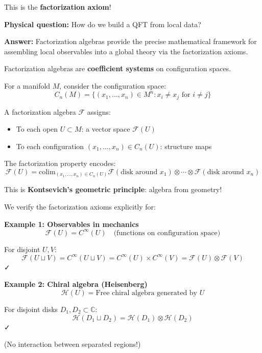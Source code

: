 \begin{example}
\begin{motivation}
This is the \textbf{factorization axiom}!

\textbf{Physical question:} How do we build a QFT from local data?

\textbf{Answer:} Factorization algebras provide the precise mathematical framework 
for assembling local observables into a global theory via the factorization axioms.
\end{motivation}

\begin{construction}
Factorization algebras are \textbf{coefficient systems} on configuration spaces.

For a manifold $M$, consider the configuration space:
$$C_n(M) = \{(x_1, \ldots, x_n) \in M^n : x_i \neq x_j \text{ for } i \neq j\}$$

A factorization algebra $\mathcal{F}$ assigns:
\begin{itemize}
\item To each open $U \subset M$: a vector space $\mathcal{F}(U)$
\item To each configuration $(x_1, \ldots, x_n) \in C_n(U)$: structure maps
\end{itemize}

The factorization property encodes:
$$\mathcal{F}(U)= \text{colim}_{(x_1,\ldots,x_n) \in C_n(U)} 
   \mathcal{F}(\text{disk around } x_1) \otimes \cdots \otimes 
   \mathcal{F}(\text{disk around } x_n)$$

This is \textbf{Kontsevich's geometric principle}: algebra from geometry!
\end{construction}

\begin{computation}
We verify the factorization axioms explicitly for:

\textbf{Example 1: Observables in mechanics}
$$\mathcal{F}(U) = C^\infty(U) \quad \text{(functions on configuration space)}$$

For disjoint $U, V$:
$$\mathcal{F}(U \sqcup V) = C^\infty(U \sqcup V) = C^\infty(U) \times C^\infty(V) 
   = \mathcal{F}(U) \otimes \mathcal{F}(V)$$ ✓

\textbf{Example 2: Chiral algebra (Heisenberg)}
$$\mathcal{H}(U) = \text{Free chiral algebra generated by } U$$

For disjoint disks $D_1, D_2 \subset \mathbb{C}$:
$$\mathcal{H}(D_1 \sqcup D_2) = \mathcal{H}(D_1) \otimes \mathcal{H}(D_2)$$ ✓

(No interaction between separated regions!)
\end{computation}


\end{example}
